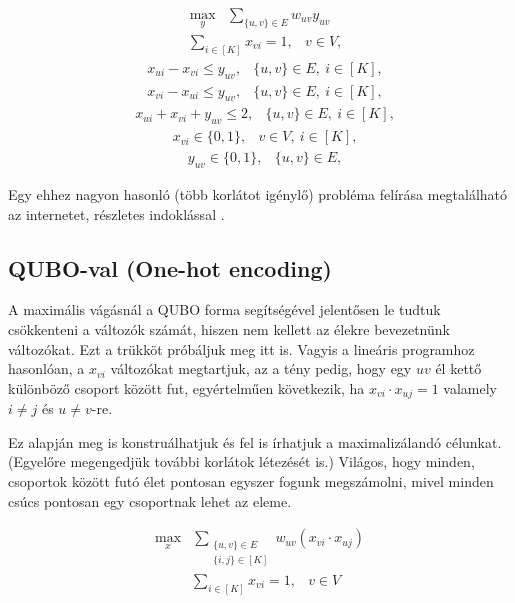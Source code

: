 \begin{align} \max _{y} &\sum _{\{{u,v}\} \in E} w_{uv}y_{uv} \end{align}
\begin{align} &\sum _{i \in [K]} x_{vi} = 1,&v \in V, \end{align}
\begin{align}&x_{ui} - x_{vi} \le y_{uv},&\{{u,v}\} \in E, \ i\in [K],\end{align}
\begin{align}&x_{vi} - x_{ui} \le y_{uv},&\{{u,v}\} \in E, \ i\in [K], \end{align}
\begin{align}&x_{ui} + x_{vi} + y_{uv} \le 2,&\{{u,v}\} \in E, \ i\in [K],\end{align}
\begin{align}&x_{vi} \in \{{0,1}\} ,&v \in V, \ i\in [K],\end{align}
\begin{align}&y_{uv} \in \{{0,1}\} ,&\{{u,v}\} \in E,\end{align}

Egy ehhez nagyon hasonló (több korlátot igénylő) probléma felírása megtalálható az internetet, részletes indoklással \cite{Hojny2021}. 

\subsection{QUBO-val (One-hot encoding)}


A maximális vágásnál a QUBO forma segítségével jelentősen le tudtuk csökkenteni a változók számát, hiszen nem kellett az élekre bevezetnünk változókat. Ezt a trükköt próbáljuk meg itt is.
Vagyis a lineáris programhoz hasonlóan, a $x_{vi}$ változókat megtartjuk, az a tény pedig, hogy egy $uv$ él kettő különböző csoport között fut, egyértelműen következik, ha $x_{vi} \cdot x_{uj}=1$ valamely $i \neq j$ és $u \neq v$-re.

Ez alapján meg is konstruálhatjuk és fel is írhatjuk a maximalizálandó célunkat. (Egyelőre megengedjük további korlátok létezését is.) Világos, hogy minden, csoportok között futó élet pontosan egyszer fogunk megszámolni, mivel minden csúcs pontosan egy csoportnak lehet az eleme.

\begin{align} \max_{x} &\sum _{\substack{\{{u,v}\} \in E \\ \{{i,j}\} \in [K]}} w_{uv}(x_{vi} \cdot x_{uj}) \end{align}
\begin{align} &\sum _{i \in [K]} x_{vi} = 1, &v \in V \end {align}

